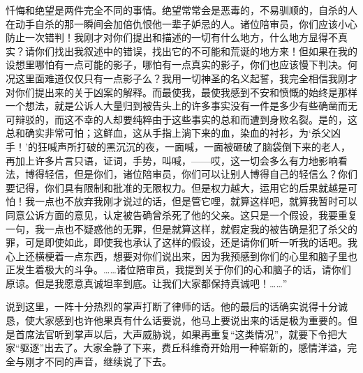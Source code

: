 忏悔和绝望是两件完全不同的事情。绝望常常会是恶毒的，不易驯顺的，自杀的人在动手自杀的那一瞬间会加倍仇恨他一辈子妒忌的人。诸位陪审员，你们应该小心防止一次错判！我刚才对你们提出和描述的一切有什么地方，什么地方显得不真实？请你们找出我叙述中的错误，找出它的不可能和荒诞的地方来！但如果在我的设想里哪怕有一点可能的影子，哪怕有一点真实的影子，你们也应该慢下判决。何况这里面难道仅仅只有一点影子么？我用一切神圣的名义起誓，我完全相信我刚才对你们提出来的关于凶案的解释。而最使我，最使我感到不安和愤慨的始终是那样一个想法，就是公诉人大量归到被告头上的许多事实没有一件是多少有些确凿而无可辩驳的，而这不幸的人却要纯粹由于这些事实的总和而遭到身败名裂。是的，这总和确实非常可怕；这鲜血，这从手指上淌下来的血，染血的衬衫，为‘杀父凶手！’的狂喊声所打破的黑沉沉的夜，一面喊，一面被砸破了脑袋倒下来的老人，再加上许多片言只语，证词，手势，叫喊，——哎，这一切会多么有力地影响看法，博得轻信，但是你们，诸位陪审员，你们可以让别人博得自己的轻信么？你们要记得，你们具有限制和批准的无限权力。但是权力越大，运用它的后果就越是可怕！我一点也不放弃我刚才说过的话，但是管它哩，就算这样吧，就算我暂时可以同意公诉方面的意见，认定被告确曾杀死了他的父亲。这只是一个假设，我要重复一句，我一点也不疑惑他的无罪，但是就算这样，就假定我的被告确是犯了杀父的罪，可是即使如此，即使我也承认了这样的假设，还是请你们听一听我的话吧。我心上还横梗着一点东西，想要对你们说出来，因为我预感到你们的心里和脑子里也正发生着极大的斗争。……诸位陪审员，我提到关于你们的心和脑子的话，请你们原谅。但是我愿意真诚坦率到底。让我们大家都保持真诚吧！……”
\par 说到这里，一阵十分热烈的掌声打断了律师的话。他的最后的话确实说得十分诚恳，使大家感到也许他果真有什么话要说，他马上要说出来的话是极为重要的。但是首席法官听到掌声以后，大声威胁说，如果再重复“这类情况”，就要下令把大家“驱逐”出去了。大家全静了下来，费丘科维奇开始用一种崭新的，感情洋溢，完全与刚才不同的声音，继续说了下去。
